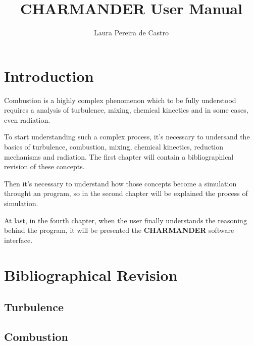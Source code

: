 \documentclass[letterpaper, 10 pt]{report}
\begin{document}
\title{CHARMANDER User Manual}
\author{Laura Pereira de Castro	}
\maketitle
\pagestyle{empty}

\tableofcontents
\newpage

\section{Introduction}

Combustion is a highly complex phenomenon which to be fully understood requires a analysis of turbulence, mixing, chemical kinectics and in some cases, even radiation.

To start understanding such a complex process, it's necessary to undersand the basics of turbulence, combustion, mixing, chemical kinectics, reduction mechanisms and radiation. The first chapter will contain a bibliographical revision of these concepts.

Then it's necessary to understand how those concepts become a simulation throught an program, so in the second chapter will be explained the process of simulation.

At last, in the fourth chapter, when the user finally understands the reasoning behind the program, it will be presented the \textbf{CHARMANDER} software interface.

\newpage

\section{Bibliographical Revision}
\subsection{Turbulence}
\subsection{Combustion}
\end{document}
